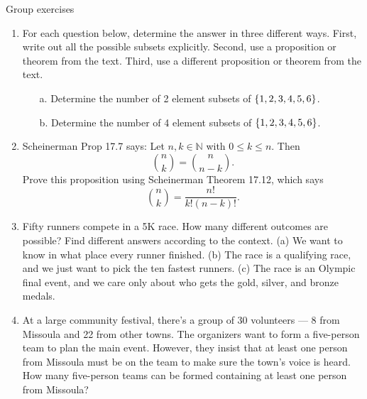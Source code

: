 \documentclass[10pt]{beamer}
\begin{document}
\begin{frame}{Group exercises}
\footnotesize
\begin{enumerate}
	\item For each question below, determine the answer in three different ways.  First, write out all the possible subsets explicitly.  Second, use a proposition or theorem from the text.  Third, use a different proposition or theorem from the text.  

	\begin{itemize} \footnotesize 
	\item[a.] Determine the number of 2 element subsets of $\{ {1,2,3,4,5,6} \}$.
	\item[b.] Determine the number of 4 element subsets of $\{ {1,2,3,4,5,6} \}$.
	\end{itemize}
	\item Scheinerman Prop 17.7 says: Let $n,k \in \mathbb{N}$ with $0 \leq k \leq n$.  Then 
		\[ \binom{n}{k} = \binom{n}{n-k}. \]
	Prove this proposition using Scheinerman  Theorem 17.12, which says
		\[ \binom{n}{k} = \frac{n!}{k!(n-k)!}. \]
	\item Fifty runners compete in a 5K race.  How many different outcomes are possible? Find different answers according to the context. (a) We want to know in what place every runner finished.  (b) The race is a qualifying race, and we just want to pick the ten fastest runners. (c) The race is an Olympic final event, and we care only about who gets the gold, silver, and bronze medals.
	\item   At a large community festival, there’s a group of 30 volunteers — 8 from Missoula and 22 from other towns. The organizers want to form a five-person team to plan the main event. However, they insist that at least one person from Missoula must be on the team to make sure the town’s voice is heard. How many five-person teams can be formed containing at least one person from Missoula?
	\end{enumerate}

\end{frame}
\end{document}
